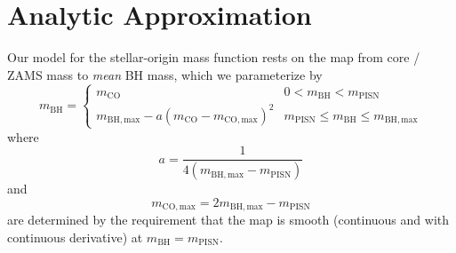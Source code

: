 \documentclass[modern]{aastex631}
\newcommand{\mBH}{\ensuremath{m_\mathrm{BH}}}
\newcommand{\mBHMax}{\ensuremath{m_{\mathrm{BH},\mathrm{max}}}}
\newcommand{\mCO}{\ensuremath{m_{\mathrm{CO}}}}
\newcommand{\mCOMax}{\ensuremath{m_{\mathrm{CO},\mathrm{max}}}}
\newcommand{\mPISN}{\ensuremath{m_\mathrm{PISN}}}
\begin{document}



\appendix

\section{Analytic Approximation}

Our model for the stellar-origin mass function rests on the map from core / ZAMS
mass to \emph{mean} BH mass, which we parameterize by 
\begin{equation}
    \mBH = \begin{cases}
        \mCO & 0 < \mBH < \mPISN \\
        \mBHMax - a \left( \mCO - \mCOMax \right)^2 & \mPISN \leq \mBH \leq \mBHMax
    \end{cases}
\end{equation}
where 
\begin{equation}
    a = \frac{1}{4\left( \mBHMax - \mPISN \right)}
\end{equation}
and
\begin{equation}
    \mCOMax = 2 \mBHMax - \mPISN
\end{equation}
are determined by the requirement that the map is smooth (continuous and with
continuous derivative) at $\mBH = \mPISN$.


\end{document}
